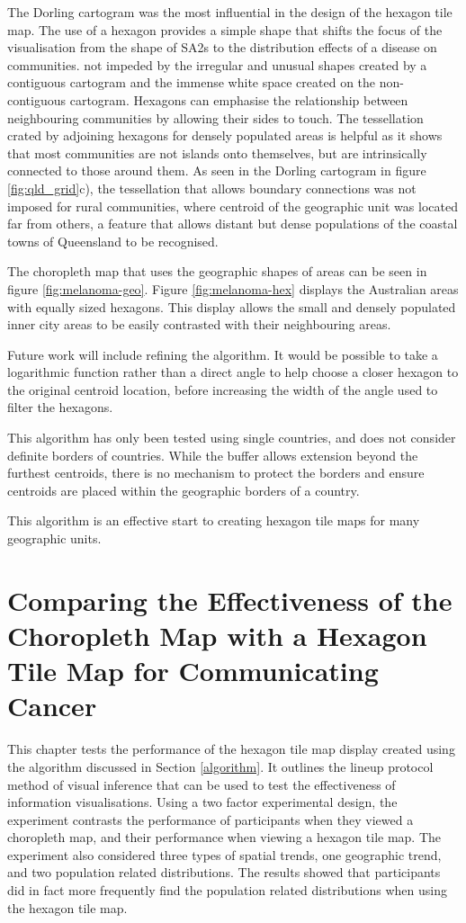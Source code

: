 \documentclass{monashthesis}
\begin{document}
The Dorling cartogram was the most influential in the design of the hexagon tile map.
The use of a hexagon provides a simple shape that shifts the focus of the visualisation from the shape of SA2s to the distribution effects of a disease on communities. not impeded by the irregular and unusual shapes created by a contiguous cartogram and the immense white space created on the non-contiguous cartogram.
Hexagons can emphasise the relationship between neighbouring communities by allowing their sides to touch. The tessellation crated by adjoining hexagons for densely populated areas is helpful as it shows that most communities are not islands onto themselves, but are intrinsically connected to those around them. As seen in the Dorling cartogram in figure \ref{fig:qld_grid}c), the tessellation that allows boundary connections was not imposed for rural communities, where centroid of the geographic unit was located far from others, a feature that allows distant but dense populations of the coastal towns of Queensland to be recognised.

The choropleth map that uses the geographic shapes of areas can be seen in figure \ref{fig:melanoma-geo}.
Figure \ref{fig:melanoma-hex} displays the Australian areas with equally sized hexagons. This display allows the small and densely populated inner city areas to be easily contrasted with their neighbouring areas.

Future work will include refining the algorithm. It would be possible to take a logarithmic function rather than a direct angle to help choose a closer hexagon to the original centroid location, before increasing the width of the angle used to filter the hexagons.

This algorithm has only been tested using single countries, and does not consider definite borders of countries. While the buffer allows extension beyond the furthest centroids, there is no mechanism to protect the borders and ensure centroids are placed within the geographic borders of a country.

This algorithm is an effective start to creating hexagon tile maps for many geographic units.

\hypertarget{experiment}{%
\chapter{Comparing the Effectiveness of the Choropleth Map with a Hexagon Tile Map for Communicating Cancer}\label{experiment}}

This chapter tests the performance of the hexagon tile map display created using the algorithm discussed in Section \ref{algorithm}.
It outlines the lineup protocol method of visual inference that can be used to test the effectiveness of information visualisations.
Using a two factor experimental design, the experiment contrasts the performance of participants when they viewed a choropleth map, and their performance when viewing a hexagon tile map.
The experiment also considered three types of spatial trends, one geographic trend, and two population related distributions.
The results showed that participants did in fact more frequently find the population related distributions when using the hexagon tile map.
\end{document}
